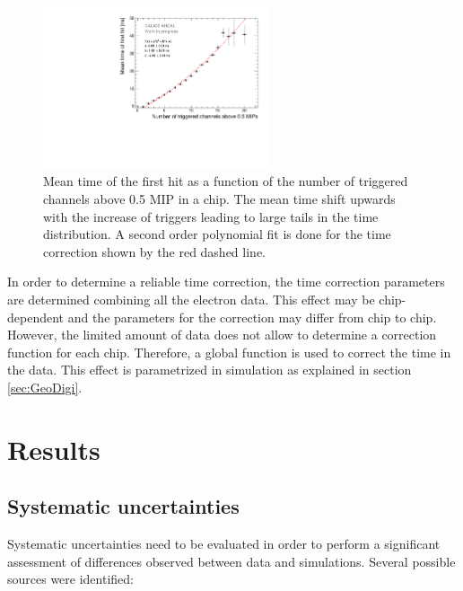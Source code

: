 \documentclass{JINST}
\begin{document}
\begin{figure}[htbp!]
	\centering
	\includegraphics[width=0.6\textwidth]{fig/NumberHits_Dependance_AllEnergies.pdf}
	\caption{Mean time of the first hit as a function of the number of triggered channels above 0.5 MIP in a chip. The mean time shift upwards with the increase of triggers leading to large tails in the time distribution. A second order polynomial fit is done for the time correction shown by the red dashed line.}\label{fig:nhits_profile}
\end{figure}

In order to determine a reliable time correction, the time correction parameters are determined combining all the electron data. This effect may be chip-dependent and the parameters for the correction may differ from chip to chip. However, the limited amount of data does not allow to determine a correction function for each chip. Therefore, a global function is used to correct the time in the data. This effect is parametrized in simulation as explained in section \ref{sec:GeoDigi}.

\section{Results}

\subsection{Systematic uncertainties}

Systematic uncertainties need to be evaluated in order to perform a significant assessment of differences observed between data and simulations. Several possible sources were identified:
\end{document}
